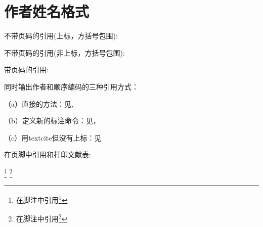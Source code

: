 \documentclass[twoside]{article}
\begin{document}
    \section{作者姓名格式}

 不带页码的引用(上标，方括号包围):
 \cite{FOURNEY1971-17-38}\cite{wang2006another}

 不带页码的引用(非上标，方括号包围):
 \parencite{FOURNEY1971-17-38}\parencite{wang2006another}

 带页码的引用:
 \cite[见][49页]{FOURNEY1971-17-38} \parencite[见][49页]{wang2006another}


 同时输出作者和顺序编码的三种引用方式：

（a）直接的方法：见\citeauthor{FOURNEY1971-17-38}\cite{FOURNEY1971-17-38}, \citeauthor{wang2006another}\cite{wang2006another}

（b）定义新的标注命令：见，

（c）用textcite但没有上标：见\textcite{FOURNEY1971-17-38,wang2006another}

 在页脚中引用和打印文献表:

 \footnote{在脚注中引用\footcite{FOURNEY1971-17-38}} 
 \footnote{在脚注中引用\footcite{wang2006another}} 

 \nocite{*}

    \printbibliography[category=kindsofnameformats,title=五种不同的姓名格式]

    \printbibliography[notcategory=kindsofnameformats,title=某种期刊的姓名格式]

    
\end{document}

